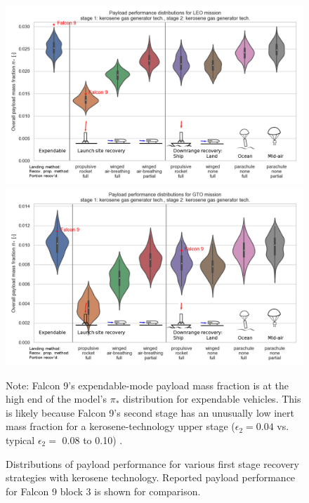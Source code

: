 \documentclass{iaf-iac}
\begin{document}
\begin{multicols}{2}
\begin{figure}
    \centering
    \includegraphics[width=\textwidth]{strategy_perf_annotated/LEO_kero}
    \includegraphics[width=\textwidth]{strategy_perf_annotated/GTO_kero}
    \caption{\label{fig:strategy_perf_kerosene} Distributions of payload performance for various first stage recovery strategies with kerosene technology. Reported payload performance for Falcon 9 block 3 is shown for comparison.}
    \small Note: Falcon 9's expendable-mode payload mass fraction is at the high end of the model's $\pi_*$ distribution for expendable vehicles. This is likely because Falcon 9's second stage has an unusually low inert mass fraction for a kerosene-technology upper stage ($\epsilon_2 = 0.04$ vs. typical $\epsilon_2 =$ 0.08 to 0.10) \cite{slr:falcon_9}.
\end{figure}


\end{multicols}
\end{document}
